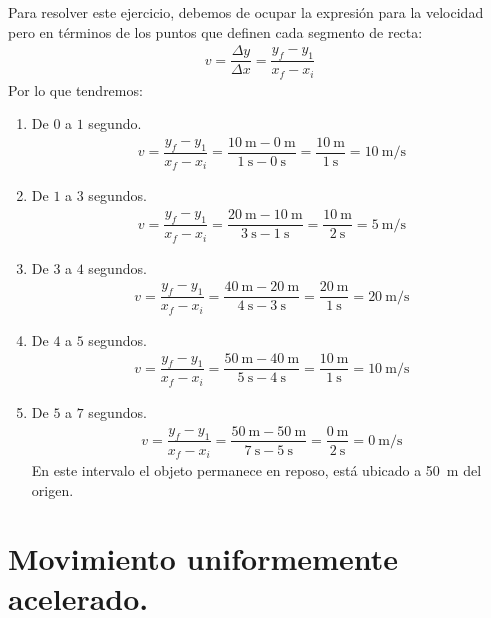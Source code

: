 \documentclass[14pt]{extarticle}
\begin{document}
Para resolver este ejercicio, debemos de ocupar la expresión para la velocidad pero en términos de los puntos que definen cada segmento de recta:
\begin{align*}
v = \dfrac{\Delta y}{\Delta x} = \dfrac{y_{f} - y_{1}}{x_{f} - x_{i}}
\end{align*}
Por lo que tendremos:
\begin{enumerate}[label=\roman*)]
\item De $0$ a $1$ segundo.
\begin{align*}
v = \dfrac{y_{f} - y_{1}}{x_{f} - x_{i}} = \dfrac{\SI{10}{\meter} - \SI{0}{\meter}}{\SI{1}{\second} - \SI{0}{\second}} = \dfrac{\SI{10}{\meter}}{\SI{1}{\second}} = \SI[per-mode=fraction]{10}{\meter\per\second}
\end{align*}
\item De $1$ a $3$ segundos.
\begin{align*}
v = \dfrac{y_{f} - y_{1}}{x_{f} - x_{i}} = \dfrac{\SI{20}{\meter} - \SI{10}{\meter}}{\SI{3}{\second} - \SI{1}{\second}} = \dfrac{\SI{10}{\meter}}{\SI{2}{\second}} = \SI[per-mode=fraction]{5}{\meter\per\second}
\end{align*}
\item De $3$ a $4$ segundos.
\begin{align*}
v = \dfrac{y_{f} - y_{1}}{x_{f} - x_{i}} = \dfrac{\SI{40}{\meter} - \SI{20}{\meter}}{\SI{4}{\second} - \SI{3}{\second}} = \dfrac{\SI{20}{\meter}}{\SI{1}{\second}} = \SI[per-mode=fraction]{20}{\meter\per\second}
\end{align*}
\item De $4$ a $5$ segundos.
\begin{align*}
v = \dfrac{y_{f} - y_{1}}{x_{f} - x_{i}} = \dfrac{\SI{50}{\meter} - \SI{40}{\meter}}{\SI{5}{\second} - \SI{4}{\second}} = \dfrac{\SI{10}{\meter}}{\SI{1}{\second}} = \SI[per-mode=fraction]{10}{\meter\per\second}
\end{align*}
\item De $5$ a $7$ segundos.
\begin{align*}
v = \dfrac{y_{f} - y_{1}}{x_{f} - x_{i}} = \dfrac{\SI{50}{\meter} - \SI{50}{\meter}}{\SI{7}{\second} - \SI{5}{\second}} = \dfrac{\SI{0}{\meter}}{\SI{2}{\second}} = \SI[per-mode=fraction]{0}{\meter\per\second}
\end{align*}
En este intervalo el objeto permanece en reposo, está ubicado a \SI{50}{\meter} del origen.
\end{enumerate}

\section{Movimiento uniformemente acelerado.}
\end{document}
